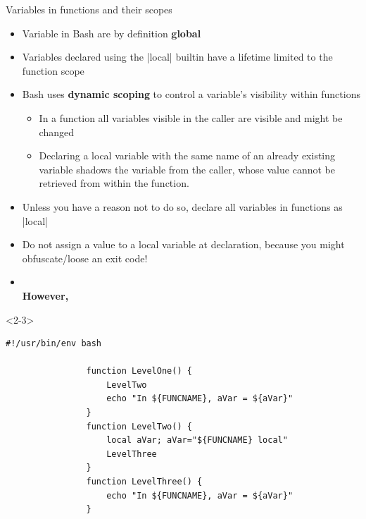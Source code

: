 \begin{frame}[fragile]{Variables in functions and their scopes}
    \begin{overlayarea}{\textwidth}{0.7\textheight}
        \begin{itemize}
            \item<only@-5> Variable in Bash are by definition \alert{\textbf{global}}
            \item<only@-5> Variables declared using the \bash|local| builtin have a lifetime limited to the function scope
            \item<only@1,4-5> Bash uses \textbf{dynamic scoping} to control a variable's visibility within functions
                  \begin{itemize}
                      \item In a function all variables visible in the caller are visible and might be changed
                      \item Declaring a local variable with the same name of an already existing variable shadows the variable from the caller, whose value cannot be retrieved from within the function.
                  \end{itemize}
            \item<only@4-5> Unless you have a reason not to do so, declare all variables in functions as \bash|local|
            \item<only@4-5> Do not assign a value to a local variable at declaration, because you might obfuscate/loose an exit code!
            \item<only@5    > \\
                           \textbf{However,} 
        \end{itemize}
        \begin{onlyenv}<2-3>
            \begin{lstlisting}[style=MyBash, aboveskip=2mm]
                #!/usr/bin/env bash

                function LevelOne() {
                    LevelTwo
                    echo "In ${FUNCNAME}, aVar = ${aVar}"
                }
                function LevelTwo() {
                    local aVar; aVar="${FUNCNAME} local"
                    LevelThree
                }
                function LevelThree() {
                    echo "In ${FUNCNAME}, aVar = ${aVar}"
                }


\end{lstlisting}
\end{onlyenv}
\end{overlayarea}
\end{frame}
